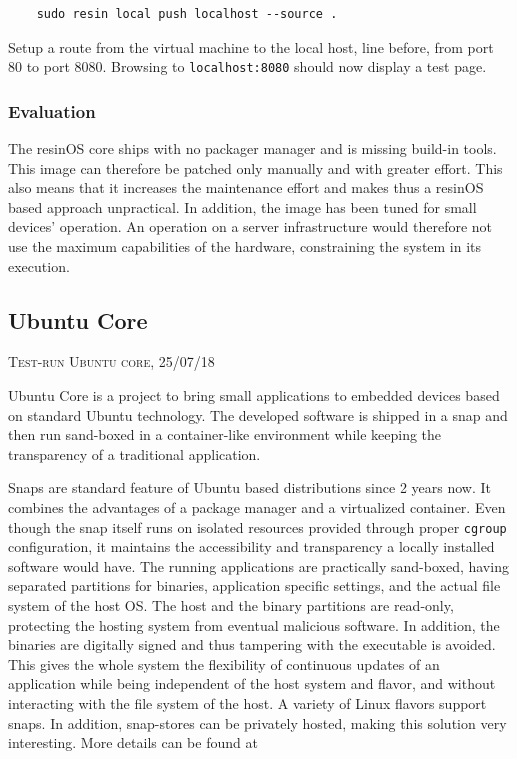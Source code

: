 \documentclass[]{scrartcl}
\begin{document}
\begin{verbatim}
	sudo resin local push localhost --source .
\end{verbatim}

Setup a route from the virtual machine to the local host, line before, from port 80 to port 8080. Browsing to \texttt{localhost:8080} should now display a test page.

\subsubsection{Evaluation}

The resinOS core ships with no packager manager and is missing build-in tools. This image can therefore be patched only manually and with greater effort. This also means that it increases the maintenance effort and makes thus a resinOS based approach unpractical. In addition, the image has been tuned for small devices' operation. An operation on a server infrastructure would therefore not use the maximum capabilities of the hardware, constraining the system in its execution.

\subsection{Ubuntu Core}
{\small\textsc{Test-run Ubuntu core, 25/07/18} \bigskip}

Ubuntu Core is a project to bring small applications to embedded devices based on standard Ubuntu technology. The developed software is shipped in a snap and then run sand-boxed in a container-like environment while keeping the transparency of a traditional application. 

Snaps are standard feature of Ubuntu based distributions since 2 years now. It combines the advantages of a package manager and a virtualized container. Even though the snap itself runs on isolated resources provided through proper \texttt{cgroup} configuration, it maintains the accessibility and transparency a locally installed software would have. The running applications are practically sand-boxed, having separated partitions for binaries, application specific settings, and the actual file system of the host OS. The host and the binary partitions are read-only, protecting the hosting system from eventual malicious software. In addition, the binaries are digitally signed and thus tampering with the executable is avoided. This gives the whole system the flexibility of continuous updates of an application while being independent of the host system and flavor, and without interacting with the file system of the host.
A variety of Linux flavors support snaps. In addition, snap-stores can be privately hosted, making this solution very interesting. More details can be found at \cite{snap01}
\end{document}
